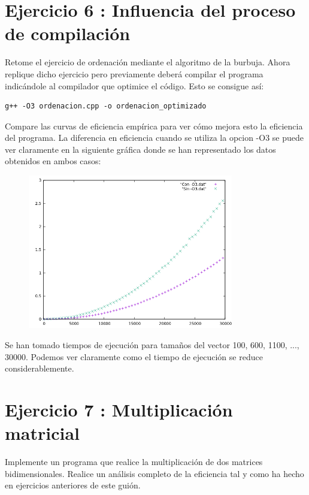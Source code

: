 \documentclass{article}
\begin{document}
\section{Ejercicio 6 : Influencia del proceso de compilación}
Retome el ejercicio de ordenación mediante el algoritmo de la burbuja. Ahora replique
dicho ejercicio pero previamente deberá compilar el programa indicándole al compilador
que optimice el código. Esto se consigue así:
\begin{verbatim}
g++ -O3 ordenacion.cpp -o ordenacion_optimizado
\end{verbatim}
Compare las curvas de eficiencia empírica para ver cómo mejora esto la eficiencia del programa.
\clearpage
La diferencia en eficiencia cuando se utiliza la opcion -O3 se puede ver claramente en la siguiente gráfica donde se han representado los datos obtenidos en ambos casos: 
\begin{figure}[H]
  \caption{}
  \centering
  \includegraphics[width=0.8\textwidth]{comparacion.png}
\end{figure}
Se han tomado tiempos de ejecución para tamaños del vector 100, 600, 1100, ..., 30000. Podemos ver claramente como el tiempo de ejecución se reduce considerablemente.
\clearpage
\section{Ejercicio 7 : Multiplicación matricial}
Implemente un programa que realice la multiplicación de dos matrices bidimensionales.
Realice un análisis completo de la eficiencia tal y como ha hecho en ejercicios anteriores de este guión.
\clearpage
\end{document}
